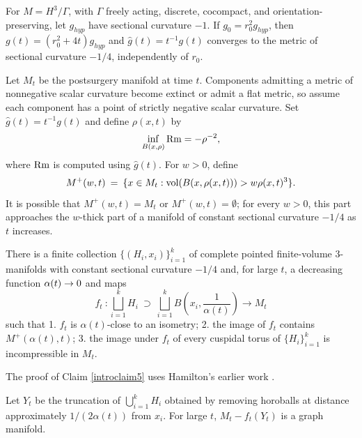 For $M=H^3/\Gamma$, with $\Gamma$ freely acting, discrete, cocompact, and
orientation-preserving, let $g_{hyp}$ have sectional curvature $-1$.  If
$g_0=r_0^2g_{hyp}$, then
$g(t)=(r_0^2+4t)g_{hyp}$ and
$\widehat g(t)=t^{-1}g(t)$ converges to the metric of sectional curvature
$-1/4$, independently of $r_0$.

Let $M_t$ be the postsurgery manifold at time $t$.  Components admitting a
metric of nonnegative scalar curvature become extinct or admit a flat metric,
so assume each component has a point of strictly negative scalar curvature.
Set $\widehat g(t)=t^{-1}g(t)$ and define $\rho(x,t)$ by
\[
\inf_{B(x,\rho)}\operatorname{Rm}=-\rho^{-2},
\]
where $\operatorname{Rm}$ is computed using $\widehat g(t)$.  For $w>0$, define
\begin{equation}
M^+(w,t)\: =\:
\{x\in M_t:\operatorname{vol}(B(x,\rho(x,t)))>w\rho(x,t)^3\}.
\end{equation}
It is possible that $M^+(w,t)=M_t$ or $M^+(w,t)=\emptyset$; for every
$w>0$, this part approaches the $w$-thick part of a manifold of constant
sectional curvature $-1/4$ as $t$ increases.

\begin{proposition}
  \label{prop:kl-overview-ricci-flow-approach-manifold-geometrization-existence-sectional-curvature}
 \cite{Perelman2} \label{introclaim5}
There is a finite collection $\{(H_i,x_i)\}_{i=1}^k$ of complete pointed
finite-volume $3$-manifolds with constant sectional curvature $-1/4$ and, for
large $t$, a decreasing function $\alpha(t)\rightarrow0$ and maps
\begin{equation}
f_t\: :\bigsqcup_{i=1}^kH_i\:\supset\:
\bigsqcup_{i=1}^k B\left(x_i,\frac{1}{\alpha(t)}\right)\longrightarrow M_t
\end{equation}
such that
1. $f_t$ is $\alpha(t)$-close to an isometry;
2. the image of $f_t$ contains $M^+(\alpha(t),t)$;
3. the image under $f_t$ of every cuspidal torus of $\{H_i\}_{i=1}^k$ is
incompressible in $M_t$.
\end{proposition}

The proof of Claim \ref{introclaim5} uses Hamilton's earlier work
\cite{Hamiltonn}.

\begin{proposition}
  \label{prop:kl-overview-ricci-flow-approach-manifold-geometrization-graph-manifolds-proposition}
 \cite{Perelman2,Shioya-Yamaguchi} \label{introclaim6}
Let $Y_t$ be the truncation of $\bigcup_{i=1}^kH_i$ obtained by removing
horoballs at distance approximately $1/(2\alpha(t))$ from $x_i$.  For large
$t$, $M_t-f_t(Y_t)$ is a graph manifold.
\end{proposition}

